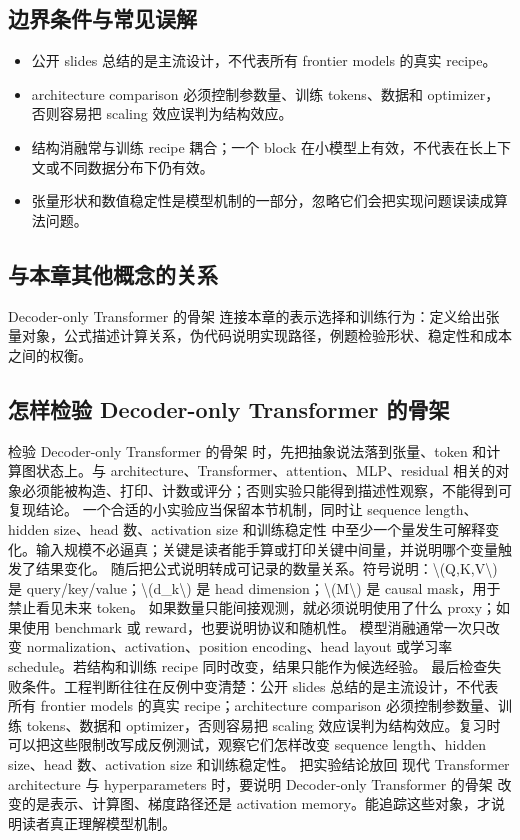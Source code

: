 \documentclass[a4paper]{article}
\begin{document}
\subsection{边界条件与常见误解}
\begin{itemize}
\item 公开 slides 总结的是主流设计，不代表所有 frontier models 的真实 recipe。
\item architecture comparison 必须控制参数量、训练 tokens、数据和 optimizer，否则容易把 scaling 效应误判为结构效应。
\item 结构消融常与训练 recipe 耦合；一个 block 在小模型上有效，不代表在长上下文或不同数据分布下仍有效。
\item 张量形状和数值稳定性是模型机制的一部分，忽略它们会把实现问题误读成算法问题。
\end{itemize}
\subsection{与本章其他概念的关系}
Decoder-only Transformer 的骨架 连接本章的表示选择和训练行为：定义给出张量对象，公式描述计算关系，伪代码说明实现路径，例题检验形状、稳定性和成本之间的权衡。
\subsection{怎样检验 Decoder-only Transformer 的骨架}
检验 Decoder-only Transformer 的骨架 时，先把抽象说法落到张量、token 和计算图状态上。与 architecture、Transformer、attention、MLP、residual 相关的对象必须能被构造、打印、计数或评分；否则实验只能得到描述性观察，不能得到可复现结论。
一个合适的小实验应当保留本节机制，同时让 sequence length、hidden size、head 数、activation size 和训练稳定性 中至少一个量发生可解释变化。输入规模不必逼真；关键是读者能手算或打印关键中间量，并说明哪个变量触发了结果变化。
随后把公式说明转成可记录的数量关系。符号说明：\textbackslash{}(Q,K,V\textbackslash{}) 是 query/key/value；\textbackslash{}(d\_k\textbackslash{}) 是 head dimension；\textbackslash{}(M\textbackslash{}) 是 causal mask，用于禁止看见未来 token。 如果数量只能间接观测，就必须说明使用了什么 proxy；如果使用 benchmark 或 reward，也要说明协议和随机性。
模型消融通常一次只改变 normalization、activation、position encoding、head layout 或学习率 schedule。若结构和训练 recipe 同时改变，结果只能作为候选经验。
最后检查失败条件。工程判断往往在反例中变清楚：公开 slides 总结的是主流设计，不代表所有 frontier models 的真实 recipe；architecture comparison 必须控制参数量、训练 tokens、数据和 optimizer，否则容易把 scaling 效应误判为结构效应。复习时可以把这些限制改写成反例测试，观察它们怎样改变 sequence length、hidden size、head 数、activation size 和训练稳定性。
把实验结论放回 现代 Transformer architecture 与 hyperparameters 时，要说明 Decoder-only Transformer 的骨架 改变的是表示、计算图、梯度路径还是 activation memory。能追踪这些对象，才说明读者真正理解模型机制。
\end{document}
